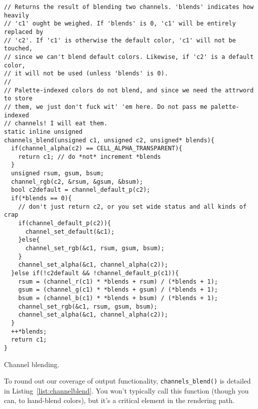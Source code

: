 \begin{listing}[!htb]
\begin{verbatim}
// Returns the result of blending two channels. 'blends' indicates how heavily
// 'c1' ought be weighed. If 'blends' is 0, 'c1' will be entirely replaced by
// 'c2'. If 'c1' is otherwise the default color, 'c1' will not be touched,
// since we can't blend default colors. Likewise, if 'c2' is a default color,
// it will not be used (unless 'blends' is 0).
//
// Palette-indexed colors do not blend, and since we need the attrword to store
// them, we just don't fuck wit' 'em here. Do not pass me palette-indexed
// channels! I will eat them.
static inline unsigned
channels_blend(unsigned c1, unsigned c2, unsigned* blends){
  if(channel_alpha(c2) == CELL_ALPHA_TRANSPARENT){
    return c1; // do *not* increment *blends
  }
  unsigned rsum, gsum, bsum;
  channel_rgb(c2, &rsum, &gsum, &bsum);
  bool c2default = channel_default_p(c2);
  if(*blends == 0){
    // don't just return c2, or you set wide status and all kinds of crap
    if(channel_default_p(c2)){
      channel_set_default(&c1);
    }else{
      channel_set_rgb(&c1, rsum, gsum, bsum);
    }
    channel_set_alpha(&c1, channel_alpha(c2));
  }else if(!c2default && !channel_default_p(c1)){
    rsum = (channel_r(c1) * *blends + rsum) / (*blends + 1);
    gsum = (channel_g(c1) * *blends + gsum) / (*blends + 1);
    bsum = (channel_b(c1) * *blends + bsum) / (*blends + 1);
    channel_set_rgb(&c1, rsum, gsum, bsum);
    channel_set_alpha(&c1, channel_alpha(c2));
  }
  ++*blends;
  return c1;
}
\end{verbatim}
\caption{Channel blending.}
\label{list:channelblend}
\end{listing}

To round out our coverage of output functionality, \texttt{channels\_blend()}
is detailed in Listing~\ref{list:channelblend}. You won't typically call this
function (though you can, to hand-blend colors), but it's a critical element in
the rendering path.
